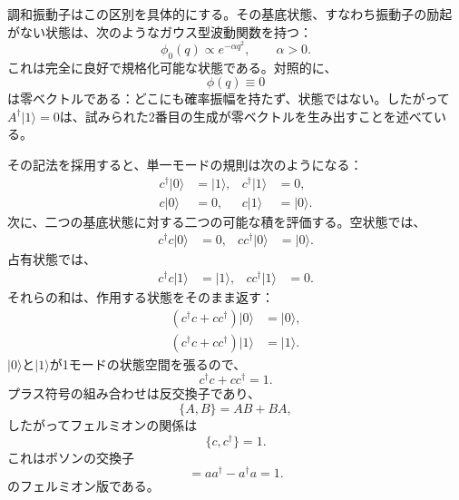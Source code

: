 \begin{classroomqa}
\end{classroomqa}

調和振動子はこの区別を具体的にする。その基底状態、すなわち振動子の励起がない状態は、次のようなガウス型波動関数を持つ：
\begin{equation}
\phi_0(q)\propto e^{-\alpha q^2},
\qquad \alpha>0.
\end{equation}
これは完全に良好で規格化可能な状態である。対照的に、
\begin{equation}
\phi(q)\equiv0
\end{equation}
は零ベクトルである：どこにも確率振幅を持たず、状態ではない。したがって\(A^\dagger|1\rangle=0\)は、試みられた2番目の生成が零ベクトルを生み出すことを述べている。

\begin{classroomqa}
\end{classroomqa}

その記法を採用すると、単一モードの規則は次のようになる：
\begin{align}
c^\dagger|0\rangle&=|1\rangle,
&c^\dagger|1\rangle&=0,
\\
c|0\rangle&=0,
&c|1\rangle&=|0\rangle.
\end{align}
次に、二つの基底状態に対する二つの可能な積を評価する。空状態では、
\begin{align}
c^\dagger c|0\rangle&=0,
&
cc^\dagger|0\rangle&=|0\rangle.
\end{align}
占有状態では、
\begin{align}
c^\dagger c|1\rangle&=|1\rangle,
&
cc^\dagger|1\rangle&=0.
\end{align}
それらの和は、作用する状態をそのまま返す：
\begin{align}
(c^\dagger c+cc^\dagger)|0\rangle&=|0\rangle,
\\
(c^\dagger c+cc^\dagger)|1\rangle&=|1\rangle.
\end{align}
\(|0\rangle\)と\(|1\rangle\)が1モードの状態空間を張るので、
\begin{equation}
c^\dagger c+cc^\dagger=1.
\end{equation}
プラス符号の組み合わせは反交換子であり、
\begin{equation}
\{A,B\}=AB+BA,
\end{equation}
したがってフェルミオンの関係は
\begin{equation}
\{c,c^\dagger\}=1.
\end{equation}
これはボソンの交換子
\begin{equation}
[a,a^\dagger]=aa^\dagger-a^\dagger a=1.
\end{equation}
のフェルミオン版である。

